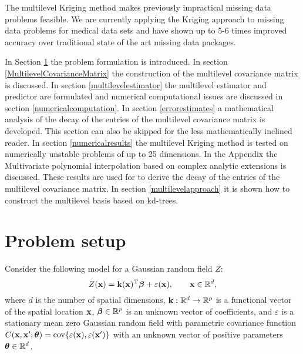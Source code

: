 \documentclass[11pt,final]{amsart}       %
\begin{document}
The multilevel Kriging method makes previously impractical missing
data problems feasible.  We are currently applying the Kriging
approach to missing data problems for medical data sets and have shown
up to 5-6 times improved accuracy over traditional state of the art
missing data packages.


In Section \ref{Introduction} the problem formulation is introduced.
In section \ref{MultilevelCovarianceMatrix} the construction of the
multilevel covariance matrix is discussed. In section
\ref{multilevelestimator} the multilevel estimator and predictor are
formulated and numerical computational issues are discussed in section
\ref{numericalcomputation}.  In section \ref{errorestimates} a
mathematical analysis of the decay of the entries of the multilevel
covariance matrix is developed. This section can also be skipped for
the less mathematically inclined reader.  In section
\ref{numericalresults} the multilevel Kriging method is tested on
numerically unstable problems of up to 25 dimensions.  In the Appendix
the Multivariate polynomial interpolation based on complex analytic
extensions is discussed. These results are used for to derive the
decay of the entries of the multilevel covariance matrix.  In section
\ref{multilevelapproach} it is shown how to construct the multilevel
basis based on kd-trees.


\section{Problem setup}
\label{Introduction}

Consider the following model for a Gaussian random field $Z$:
\begin{equation}
Z(\mathbf{x}) = \mathbf{k}(\mathbf{x})^{\rm T} \boldsymbol{\beta}+\varepsilon(\mathbf{x}), \qquad \mathbf{x} \in \Bbb{R}^d,
\label{Introduction:noisemodel}
\end{equation}
where $d$ is the number of spatial dimensions, $\mathbf{k}:\Bbb{R}^d \rightarrow
\Bbb{R}^p$ is a functional vector of the spatial location $\mathbf{x}$,
$\boldsymbol{\beta}\in\Bbb{R}^p$ is an unknown vector of coefficients, and
$\varepsilon$ is a stationary mean zero Gaussian random field with
parametric covariance function
$C(\mathbf{x},\mathbf{x}';\boldsymbol{\theta})=\hbox{cov}\{\varepsilon(\mathbf{x}),\varepsilon(\mathbf{x}')\}$ with
an unknown vector of positive parameters $\boldsymbol{\theta}\in\Bbb{R}^d$.
\end{document}
